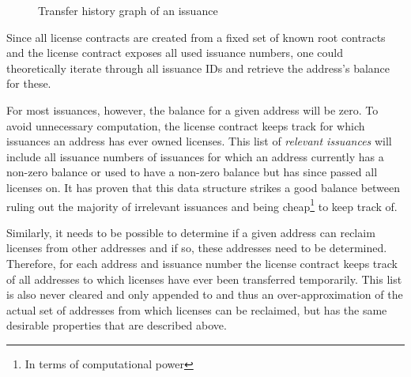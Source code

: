 \documentclass[a4paper]{article}
\begin{document}
\begin{figure}
  \caption{Transfer history graph of an issuance}
  \label{fig:transferHistory}
\end{figure}

Since all license contracts are created from a fixed set of known root contracts and the license contract exposes all used issuance numbers, one could theoretically iterate through all issuance IDs and retrieve the address's balance for these.

For most issuances, however, the balance for a given address will be zero. To avoid unnecessary computation, the license contract keeps track for which issuances an address has ever owned licenses. This list of \emph{relevant issuances} will include all issuance numbers of issuances for which an address currently has a non-zero balance or used to have a non-zero balance but has since passed all licenses on. It has proven that this data structure strikes a good balance between ruling out the majority of irrelevant issuances and being cheap\footnote{In terms of computational power} to keep track of.

Similarly, it needs to be possible to determine if a given address can reclaim licenses from other addresses and if so, these addresses need to be determined. Therefore, for each address and issuance number the license contract keeps track of all addresses to which licenses have ever been transferred temporarily. This list is also never cleared and only appended to and thus an over-approximation of the actual set of addresses from which licenses can be reclaimed, but has the same desirable properties that are described above.
\end{document}
